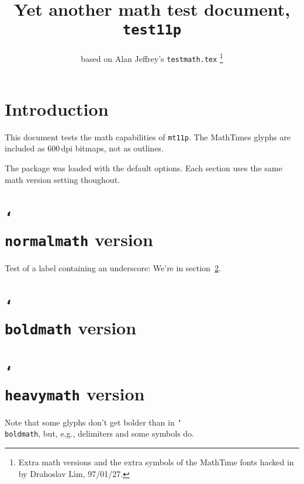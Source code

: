 \documentclass[10pt]{ltxdoc}
\title{Yet another math test document,\\
       \texttt{\bfseries test11p}}
\author{based on Alan Jeffrey's \texttt{testmath.tex}%
       \thanks{Extra math versions and
              the extra symbols of the MathT\i me fonts
              hacked in by Drahoslav L\'\i m, 97/01/27.}}
\date{}
\providecommand{\cs}[1]{\texttt{\char`\\#1}}
\begin{document}
\maketitle
\parindent=0pt %
\section{Introduction}

{\raggedright
This document tests the math capabilities of \texttt{mt11p}.
The MathT\i mes glyphs are included as 600\,dpi bitmaps,
not as outlines.

The package was loaded with the default options.
Each section uses the same math version setting thoughout.
}
\section{\cs{normalmath} version}\label{test_underscore}
Test of a label containing an underscore:
We're in section~\ref{test_underscore}.
\normalmath\TheBigTest
\section{\cs{boldmath} version}
\boldmath\TheBigTest
\section{\cs{heavymath} version}
Note that some glyphs don't get bolder than
in \cs{boldmath}, but, e.g., delimiters and some symbols do.
\heavymath\TheBigTest

\end{document}
